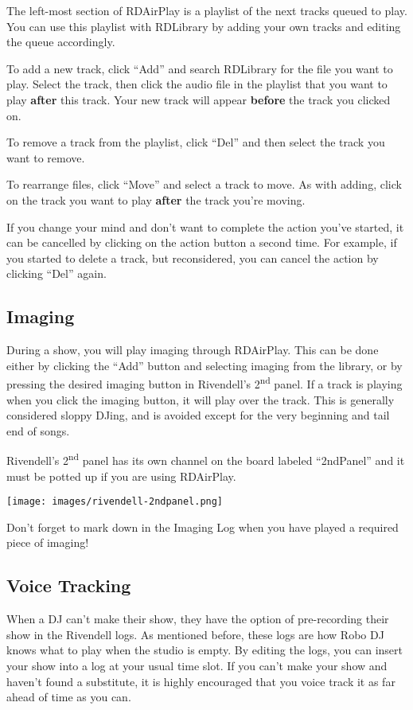 \documentclass{witrman}
\begin{document}
The left-most section of RDAirPlay is a playlist of the next tracks queued to
play.  You can use this playlist with RDLibrary by adding your own tracks and
editing the queue accordingly.

To add a new track, click ``Add'' and search RDLibrary for the file you want to
play.  Select the track, then click the audio file in the playlist that you want
to play \textbf{after} this track.  Your new track will appear \textbf{before} 
the track you clicked on.

To remove a track from the playlist, click ``Del'' and then select the track you
want to remove.

To rearrange files, click ``Move'' and select a track to move.  As with adding,
click on the track you want to play \textbf{after} the track you're moving.

If you change your mind and don't want to complete the action you've started, it
can be cancelled by clicking on the action button a second time.  For example,
if you started to delete a track, but reconsidered, you can cancel the action by
clicking ``Del'' again.

\subsection{Imaging}

During a show, you will play imaging through RDAirPlay.  This can be done either
by clicking the ``Add'' button and selecting imaging from the library, or by
pressing the desired imaging button in Rivendell's 2\textsuperscript{nd} panel.
If a track is playing when you click the imaging button, it will play over the
track.  This is generally considered sloppy DJing, and is avoided except for the
very beginning and tail end of songs.

Rivendell's 2\textsuperscript{nd} panel has its own channel on the board labeled
``2ndPanel'' and it must be potted up if you are using RDAirPlay.

\texttt{[image: images/rivendell-2ndpanel.png]}

Don't forget to mark down in the Imaging Log when you have played a required
piece of imaging!

\subsection{Voice Tracking}

When a DJ can't make their show, they have the option of pre-recording their
show in the Rivendell logs.  As mentioned before, these logs are how Robo DJ
knows what to play when the studio is empty. By editing the logs, you can insert
your show into a log at your usual time slot.  If you can't make your show and
haven't found a substitute, it is highly encouraged that you voice track it as
far ahead of time as you can.
\end{document}
